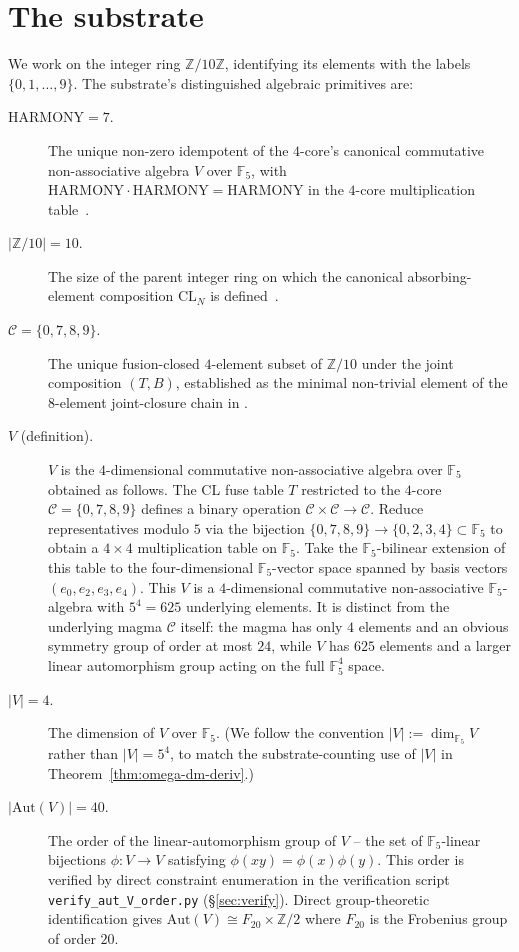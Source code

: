 \documentclass[11pt,reqno]{amsart}
\theoremstyle{plain}
\theoremstyle{definition}
\theoremstyle{remark}
\newcommand{\Z}{\mathbb{Z}}
\newcommand{\F}{\mathbb{F}}
\newcommand{\Aut}{\mathrm{Aut}}
\begin{document}
\section{The substrate}\label{sec:setup}

We work on the integer ring $\Z/10\Z$, identifying its elements
with the labels $\{0, 1, \dots, 9\}$. The substrate's
distinguished algebraic primitives are:

\begin{description}
\item[$\mathrm{HARMONY} = 7$.] The unique non-zero idempotent of
the $4$-core's canonical commutative non-associative algebra
$V$ over $\F_5$, with $\mathrm{HARMONY} \cdot \mathrm{HARMONY} =
\mathrm{HARMONY}$ in the $4$-core multiplication
table~\cite{SandersGish2026FourCore}.
\item[$|\Z/10| = 10$.] The size of the parent integer ring on
which the canonical absorbing-element composition $\mathrm{CL}_N$
is defined~\cite{SandersGish2026JCAP}.
\item[$\mathcal{C} = \{0, 7, 8, 9\}$.] The unique fusion-closed
$4$-element subset of $\Z/10$ under the joint composition
$(T, B)$, established as the minimal non-trivial element of the
$8$-element joint-closure chain in
\cite{SandersGish2026FourCore}.
\item[$V$ (definition).] $V$ is the $4$-dimensional commutative
non-associative algebra over $\F_5$ obtained as follows. The CL
fuse table $T$ restricted to the $4$-core
$\mathcal{C} = \{0, 7, 8, 9\}$ defines a binary operation
$\mathcal{C} \times \mathcal{C} \to \mathcal{C}$. Reduce
representatives modulo $5$ via the bijection
$\{0, 7, 8, 9\} \to \{0, 2, 3, 4\} \subset \F_5$ to obtain a
$4 \times 4$ multiplication table on $\F_5$. Take the
$\F_5$-bilinear extension of this table to the four-dimensional
$\F_5$-vector space spanned by basis vectors $(e_0, e_2, e_3, e_4)$.
This $V$ is a $4$-dimensional commutative non-associative
$\F_5$-algebra with $5^4 = 625$ underlying elements. It is
distinct from the underlying magma $\mathcal{C}$ itself: the
magma has only $4$ elements and an obvious symmetry group of
order at most $24$, while $V$ has $625$ elements and a larger
linear automorphism group acting on the full $\F_5^{4}$ space.
\item[$|V| = 4$.] The dimension of $V$ over $\F_5$. (We follow
the convention $|V| := \dim_{\F_5} V$ rather than $|V| = 5^4$,
to match the substrate-counting use of $|V|$ in
Theorem~\ref{thm:omega-dm-deriv}.)
\item[$|\Aut(V)| = 40$.] The order of the linear-automorphism
group of $V$ -- the set of $\F_5$-linear bijections
$\phi: V \to V$ satisfying $\phi(xy) = \phi(x)\phi(y)$. This
order is verified by direct constraint enumeration in the
verification script
\texttt{verify\_aut\_V\_order.py} (\S\ref{sec:verify}).
Direct group-theoretic identification gives
$\Aut(V) \cong F_{20} \times \Z/2$ where
$F_{20}$ is the Frobenius group of order $20$.


\end{description}
\end{document}
